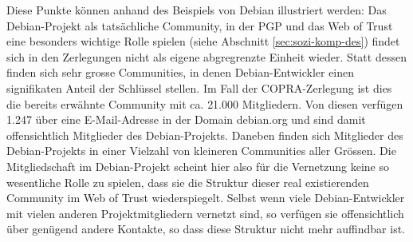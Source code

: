 Diese Punkte k\"onnen anhand des Beispiels von Debian illustriert
werden: Das Debian-Projekt als tats\"achliche Community, in der PGP
und das Web of Trust eine besonders wichtige Rolle spielen (siehe
Abschnitt \ref{sec:sozi-komp-des}) findet sich in den Zerlegungen
nicht als eigene abgregrenzte Einheit wieder. Statt dessen finden sich
sehr grosse Communities, in denen Debian-Entwickler einen signifikaten
Anteil der Schl\"ussel stellen. Im Fall der COPRA-Zerlegung ist dies
die bereits erw\"ahnte Community mit ca. 21.000 Mitgliedern. Von
diesen verf\"ugen 1.247 \"uber eine E-Mail-Adresse in der Domain
debian.org und sind damit offensichtlich Mitglieder des
Debian-Projekts. Daneben finden sich Mitglieder des Debian-Projekts in
einer Vielzahl von kleineren Communities aller Gr\"ossen. Die
Mitgliedschaft im Debian-Projekt scheint hier also f\"ur die
Vernetzung keine so wesentliche Rolle zu spielen, dass sie die
Struktur dieser real existierenden Community im Web of Trust
wiederspiegelt. Selbst wenn viele Debian-Entwickler mit vielen anderen
Projektmitgliedern vernetzt sind, so verf\"ugen sie offensichtlich
\"uber gen\"ugend andere Kontakte, so dass diese Struktur nicht mehr
auffindbar ist.


